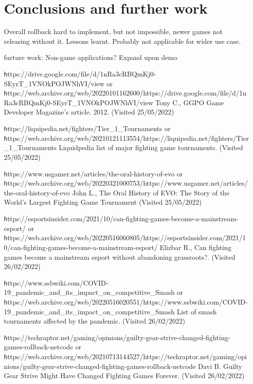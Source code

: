 \documentclass{entcs}
\begin{document}
\section{Conclusions and further work}

Overall rollback hard to implement, but not impossible, newer games not releasing without it. Lessons learnt. Probably not applicable for wider use case. 

furture work: 
Non-game applications? Expand upon demo
\begin{thebibliography}{25}

 {\texttt https://drive.google.com/file/d/1nRa3cRBQmKj0-SEyrT\_1VNOkPOJWNhVI/view} or 
{\texttt https://web.archive.org/web/20220101162600/https://drive.google.com/file/d/1nRa3cRBQmKj0-SEyrT\_1VNOkPOJWNhVI/view} 
Tony C., GGPO Game Developer Magazine's article. 2012. (Visited 25/05/2022)

 {\texttt https://liquipedia.net/fighters/Tier\_1\_Tournaments} or 
{\texttt https://web.archive.org/web/20210121113554/https://liquipedia.net/fighters/Tier\_1\_Tournaments} 
Liquidpedia list of major fighting game tournaments. (Visited 25/05/2022)

 {\texttt https://www.usgamer.net/articles/the-oral-history-of-evo} or 
{\texttt https://web.archive.org/web/20220321000753/https://www.usgamer.net/articles/the-oral-history-of-evo} 
John L., The Oral History of EVO: The Story of the World's Largest Fighting Game Tournament (Visited 25/05/2022)

 {\texttt https://esportsinsider.com/2021/10/can-fighting-games-become-a-mainstream-esport/} or 
{\texttt https://web.archive.org/web/20220516060805/https://esportsinsider.com/2021/10/can-fighting-games-become-a-mainstream-esport/} 
Elizbar R., Can fighting games become a mainstream esport without abandoning grassroots?. (Visited 26/02/2022) 

 {\texttt https://www.ssbwiki.com/COVID-19\_pandemic\_and\_its\_impact\_on\_competitive\_Smash} or {\texttt https://web.archive.org/web/20220516020551/https://www.ssbwiki.com/COVID-19\_pandemic\_and\_its\_impact\_on\_competitive\_Smash} List of smash tournaments affected by the pandemic. (Visited 26/02/2022) 

 {\texttt https://techraptor.net/gaming/opinions/guilty-gear-strive-changed-fighting-games-rollback-netcode} or {\texttt https://web.archive.org/web/20210713144527/https://techraptor.net/gaming/opinions/guilty-gear-strive-changed-fighting-games-rollback-netcode} Davi B. Guilty Gear Strive Might Have Changed Fighting Games Forever. (Visited 26/02/2022)


\end{thebibliography}
\end{document}
